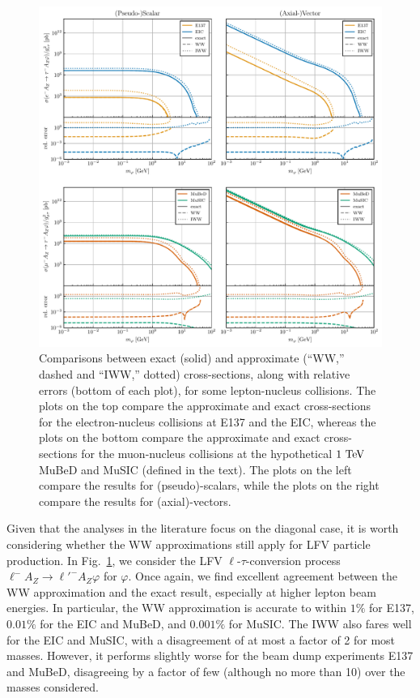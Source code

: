 \begin{figure}[t!]
    \centering
    \includegraphics[trim={2.5cm 0 2.5cm 0}, width=0.9\linewidth]{figures/chapter4/crossx_approximations_tau.pdf}
    \caption[Comparisons between cross-sections computed exactly and via the Weiz\"acker-Williams and Improved Weizs\"acker-Williams approximations for the process $\ell A_Z \rightarrow \tau A_Z \varphi$ at various lepton-nucleus collision experiments.]{Comparisons between exact (solid) and approximate (``WW,'' dashed and ``IWW,'' dotted) cross-sections, along with relative errors (bottom of each plot), for some lepton-nucleus collisions. The plots on the top compare the approximate and exact cross-sections for the electron-nucleus collisions at E137 and the EIC, whereas the plots on the bottom compare the approximate and exact cross-sections for the muon-nucleus collisions at the hypothetical $1~{\rm TeV}$ MuBeD and MuSIC (defined in the text). The plots on the left compare the results for (pseudo)-scalars, while the plots on the right compare the results for (axial)-vectors. }
    \label{fig:WW_tau}
\end{figure}
\clearpage


Given that the analyses in the literature focus on the diagonal case, it is worth considering whether the WW approximations still apply for LFV particle production. In Fig.~\ref{fig:WW_tau}, we consider the LFV $\ell$-$\tau$-conversion process $\ell^- A_Z \rightarrow \ell'^- A_Z \varphi$ for $\varphi$.  Once again, we find excellent agreement between the WW approximation and the exact result, especially at higher lepton beam energies. In particular, the WW approximation is accurate to within $1\%$ for E137, $0.01\%$ for the EIC and MuBeD, and $0.001\%$ for MuSIC. The IWW also fares well for the EIC and MuSIC, with a disagreement of at most a factor of 2 for most masses. However, it performs slightly worse for the beam dump experiments E137 and MuBeD, disagreeing by a factor of few (although no more than 10) over the masses considered.


